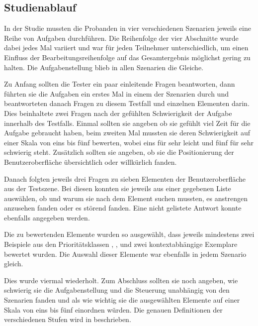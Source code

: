 		\subsection{Studienablauf}
			In der Studie mussten die Probanden in vier verschiedenen Szenarien jeweils eine Reihe von Aufgaben durchführen. Die Reihenfolge der vier Abschnitte wurde dabei jedes Mal variiert und war für jeden Teilnehmer unterschiedlich, um einen Einfluss der Bearbeitungsreihenfolge auf das Gesamtergebnis möglichst gering zu halten. Die Aufgabenstellung blieb in allen Szenarien die Gleiche.
			
			
						
			Zu Anfang sollten die Tester ein paar einleitende Fragen beantworten, dann führten sie die Aufgaben ein erstes Mal in einem der Szenarien durch und beantworteten danach Fragen zu diesem Testfall und einzelnen Elementen darin. 
			Dies beinhaltete zwei Fragen nach der gefühlten Schwierigkeit der Aufgabe innerhalb des Testfalls. Einmal sollten sie angeben ob sie gefühlt viel Zeit für die Aufgabe gebraucht haben, beim zweiten Mal mussten sie deren Schwierigkeit auf einer Skala von eins bis fünf bewerten, wobei eins für sehr leicht und fünf für sehr schwierig steht. Zusätzlich sollten sie angeben, ob sie die Positionierung der Benutzeroberfläche übersichtlich oder willkürlich fanden.
			
			
			Danach folgten jeweils drei Fragen zu sieben Elementen der Benutzeroberfläche aus der Testszene. Bei diesen konnten sie jeweils aus einer gegebenen Liste auswählen, ob und warum sie nach dem Element suchen mussten, es anstrengen anzusehen fanden oder es störend fanden. Eine nicht gelistete Antwort konnte ebenfalls angegeben werden.
			
			Die zu bewertenden Elemente wurden so ausgewählt, dass jeweils mindestens zwei Beispiele aus den Prioritätsklassen , ,  und zwei kontextabhängige Exemplare bewertet wurden.
			Die Auswahl dieser Elemente war ebenfalls in jedem Szenario gleich.
			
			Dies wurde viermal wiederholt. Zum Abschluss sollten sie noch angeben, wie schwierig sie die Aufgabenstellung und die Steuerung unabhängig von den Szenarien fanden und als wie wichtig sie die ausgewählten Elemente auf einer Skala von eins bis fünf einordnen würden. Die genauen Definitionen der verschiedenen Stufen wird in  beschrieben.
		
